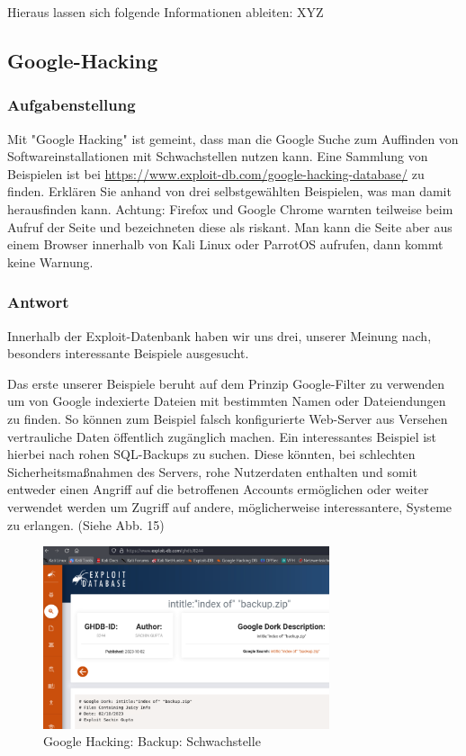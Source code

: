 \documentclass{article}
\begin{document}
Hieraus lassen sich folgende Informationen ableiten: XYZ

\newpage

\subsection{Google-Hacking}

\subsubsection*{Aufgabenstellung}

Mit "Google Hacking" ist gemeint, dass man die Google Suche zum Auffinden von
Softwareinstallationen mit Schwachstellen nutzen kann. Eine Sammlung von Beispielen ist 
bei \url{https://www.exploit-db.com/google-hacking-database/} zu finden. Erklären Sie 
anhand von drei selbstgewählten Beispielen, was man damit herausfinden kann.
Achtung: Firefox und Google Chrome warnten teilweise beim Aufruf der Seite und bezeichneten diese als riskant. Man kann die Seite aber aus einem Browser innerhalb von Kali Linux oder ParrotOS aufrufen, dann kommt keine Warnung.

\subsubsection*{Antwort}

Innerhalb der Exploit-Datenbank haben wir uns drei, unserer Meinung nach, besonders 
interessante Beispiele ausgesucht.

Das erste unserer Beispiele beruht auf dem Prinzip Google-Filter zu verwenden um von 
Google indexierte Dateien mit bestimmten Namen oder Dateiendungen zu finden. So können zum 
Beispiel falsch konfigurierte Web-Server aus Versehen vertrauliche Daten öffentlich 
zugänglich machen. Ein interessantes Beispiel ist hierbei nach rohen SQL-Backups zu 
suchen. Diese könnten, bei schlechten Sicherheitsmaßnahmen des Servers, rohe Nutzerdaten 
enthalten und somit entweder einen Angriff auf die betroffenen Accounts ermöglichen oder 
weiter verwendet werden um Zugriff auf andere, möglicherweise interessantere, Systeme zu 
erlangen. (Siehe Abb. 15)

\begin{figure}[H]
	\includegraphics[width=0.75\textwidth]{images/15}
	\centering
	\caption{Google Hacking: Backup: Schwachstelle}
\end{figure}
\end{document}
